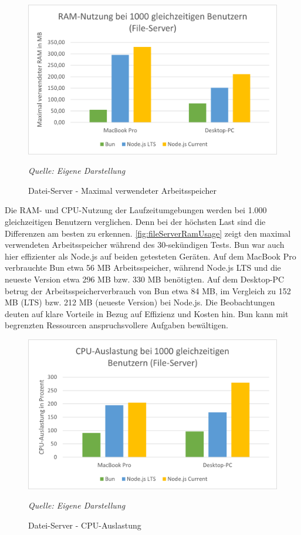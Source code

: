 \begin{figure}[h!]
	\centering
	\includegraphics[width=\linewidth]{./images/fileServerRamUsage.png}
	\caption{Datei-Server - Maximal verwendeter Arbeitsspeicher}
	\label{fig:fileServerRamUsage}
	\textit{Quelle: Eigene Darstellung}
\end{figure}


\noindent
Die RAM- und CPU-Nutzung der Laufzeitumgebungen werden bei 1.000 gleichzeitigen Benutzern verglichen. Denn bei der höchsten Last sind die Differenzen am besten zu erkennen. \autoref{fig:fileServerRamUsage} zeigt den maximal verwendeten Arbeitsspeicher während des 30-sekündigen Tests. Bun war auch hier effizienter als Node.js auf beiden getesteten Geräten. Auf dem MacBook Pro verbrauchte Bun etwa 56 MB Arbeitsspeicher, während Node.js LTS und die neueste Version etwa 296 MB bzw. 330 MB benötigten. Auf dem Desktop-PC betrug der Arbeitsspeicherverbrauch von Bun etwa 84 MB, im Vergleich zu 152 MB (LTS) bzw. 212 MB (neueste Version) bei Node.js. Die Beobachtungen deuten auf klare Vorteile in Bezug auf Effizienz und Kosten hin. Bun kann mit begrenzten Ressourcen anspruchsvollere Aufgaben bewältigen.\\

\begin{figure}[h!]
	\centering
	\includegraphics[width=\linewidth]{./images/fileServerCpuUsage.png}
	\caption{Datei-Server - CPU-Auslastung }
	\label{fig:fileServerCpuUsage}
	\textit{Quelle: Eigene Darstellung}
\end{figure}

